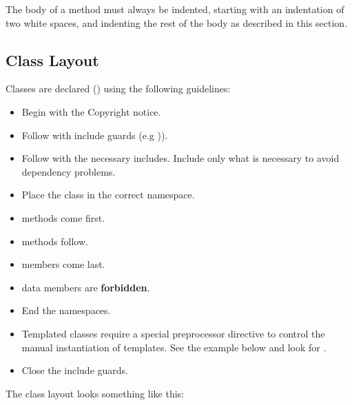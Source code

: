 The body of a method must always be indented, starting with an indentation of
two white spaces, and indenting the rest of the body as described in this
section.


\subsection{Class Layout}
\label{subsec:ClassLayout}

Classes are declared () using the following guidelines:
\begin{itemize}
\item Begin with the Copyright notice.
\item Follow with include guards (e.g )).
\item Follow with the necessary includes. Include only what is necessary to
avoid dependency problems.
\item Place the class in the correct namespace.
\item {} methods come first.
\item {} methods follow.
\item {} members come last.
\item {} data members are \textbf{forbidden}.
\item End the namespaces.
\item Templated classes require a special preprocessor directive to control the
manual instantiation of templates. See the example below and look for
.
\item Close the include guards.
\end{itemize}

The class layout looks something like this:

